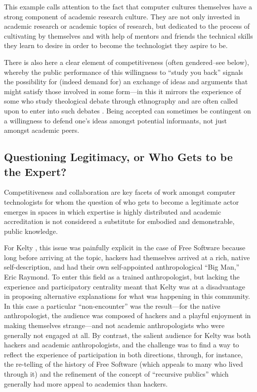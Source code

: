 \documentclass[10pt,letter,oneside]{scrartcl}
\begin{document}
This example calls attention to the fact that computer cultures
themselves have a strong component of academic research culture. They
are not only invested in academic research or academic topics of
research, but dedicated to the process of cultivating by themselves and 
with help of mentors and friends the technical skills they learn to desire
in order to become the technologist they aspire to be. 

There is also here a clear element of competitiveness (often
gendered--see below), whereby the public performance of this
willingness to ``study you back'' signals the possibility for (indeed
demand for) an exchange of ideas and arguments that might satisfy
those involved in some form---in this it mirrors the experience of
some who study theological debate through ethnography and are often
called upon to enter into such debates
\cite{FischerAbedi,Susanharding,Tuhami,HirschkindDawa}.  Being
accepted can sometimes be contingent on a willingness to defend one's
ideas amongst potential informants, not just amongst academic peers.

\subsection*{Questioning Legitimacy, or Who Gets to be the Expert?}

Competitiveness and collaboration are key facets of work amongst
computer technologists for whom the question of who gets to become a
legitimate actor emerges in spaces in which expertise is highly
distributed and academic accreditation is not considered a substitute
for embodied and demonstrable, public knowledge.

For Kelty \cite{Kelty2008}, this issue was painfully explicit in the
case of Free Software because long before arriving at the topic,
hackers had themselves arrived at a rich, native self-description, and
had their own self-appointed anthropological ``Big Man,'' Eric Raymond.
To enter this field as a trained anthropologist, but lacking the
experience and participatory centrality meant that Kelty was at a
disadvantage in proposing alternative explanations for what was
happening in this community.  In this case a particular
``non-encounter'' was the result---for the native anthropologist, the
audience was composed of hackers and a playful enjoyment in making
themselves strange---and not academic anthropologists who were
generally not engaged at all.  By contrast, the salient audience for
Kelty was both hackers and academic anthropologists, and the challenge
was to find a way to reflect the experience of participation in both
directions, through, for instance, the re-telling of the history of
Free Software (which appeals to many who lived through it) and the
refinement of the concept of ``recursive publics'' which generally had
more appeal to academics than hackers.
\end{document}
